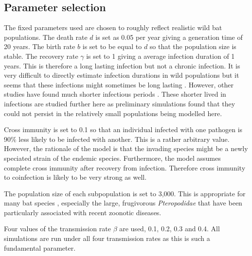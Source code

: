 \subsection{Parameter selection}


The fixed parameters used are chosen to roughly reflect realistic wild bat populations. 
The death rate $d$ is set as 0.05 per year giving a generation time of 20 years.
The birth rate $b$ is set to be equal to $d$ so that the population size is stable.
The recovery rate $\gamma$ is set to 1 giving a average infection duration of 1 years. 
This is therefore a long lasting infection but not a chronic infection. 
It is very difficult to directly estimate infection durations in wild populations but it seems that these infections might sometimes be long lasting \cite{peel2012henipavirus, plowright2015ecological}.
However, other studies have found much shorter infectious periods \cite{amengual2007temporal}.
These shorter lived in infections are studied further here as preliminary simulations found that they could not persist in the relatively small populations being modelled here.

Cross immunity is set to 0.1 so that an individual infected with one pathogen is 90\% less likely to be infected with another.
This is a rather arbitrary value.
However, the rationale of the model is that the invading species might be a newly speciated strain of the endemic species.
Furthermore, the model assumes complete cross immunity after recovery from infection.
Therefore cross immunity to coinfection is likely to be very strong as well.

The population size of each subpopulation is set to 3,000. 
This is appropriate for many bat species \cite{jones2009pantheria}, especially the large, frugivorous \emph{Pteropodidae} that have been particularly associated with recent zoonotic diseases.


Four values of the transmission rate $\beta$ are used, 0.1, 0.2, 0.3 and 0.4.
All simulations are run under all four transmission rates as this is such a fundamental parameter.

